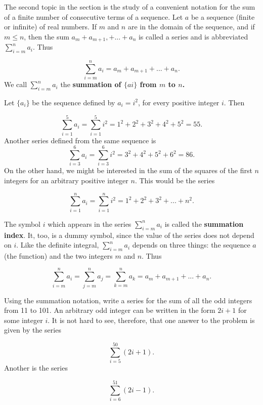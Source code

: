 The second topic in the section is the study of a convenient notation for the sum of a finite number of consecutive terms of a sequence. Let $a$ be a sequence (finite or infinite) of real numbers. If $m$ and $n$ are in the domain of the sequence, and if $m \leq n$, then the sum $a_m + a_{m+1}, + ... + a_n$ is called a series and is abbreviated $\sum_{i = m}^{n} a_{i}$. Thus 

$$
\sum_{i = m}^n a_i = a_m + a_{m+1} + ... + a_n.
$$
\noindent We call $\sum_{i = m}^{n}  a_i$ the \textbf{summation of $\{ ai \}$ from $m$ to $n$.}

\begin{example} Let $\{ a_i \}$ be the sequence defined by $a_i = i^2$, for every positive integer $i$. Then  

$$
 \sum_{i = 1}^{5} a_i =  \sum_{i = 1}^{5} i^2 = 1^2 + 2^2 + 3^2 + 4^2 + 5^2 = 55.
$$
\noindent Another series defined from the same sequence is
$$
 \sum_{i = 3}^{6}a_i = \sum_{i = 3}^{6} i^2 = 3^2 + 4^2 + 5^2 + 6^2 = 86. 
$$
\noindent On the other hand, we might be interested in the sum of the squares of the first $n$ integers for an arbitrary positive integer $n$. This would be the series 

$$
 \sum_{i = 1}^{n} a_i =  \sum_{i = 1}^{n} i^2 = 1^2 + 2^2 + 3^2 + ... + n^2.
$$
\end{example}
\medskip

The symbol $i$ which appears in the series $ \sum_{i = m}^{n} a_i$ is called the \textbf{summation index}. It, too, is a dummy symbol, since the value of the series does not
depend on $i$. Like the definite integral, $ \sum_{i = m}^{n} a_i$ depends on three things: the sequence $a$ (the function) and the two integers $m$ and $n$. Thus

$$
 \sum_{i = m}^{n} a_i =  \sum_{j = m}^{n} a_j =  \sum_{k = m}^{n} a_k = a_m + a_{m+1} + ... + a_n.
$$

\begin{example}
Using the summation notation, write a series for the sum of all the odd integers
from 11 to 101. An arbitrary odd integer can be written in the form $2i + 1$ for some integer $i$. It is not hard to see, therefore, that one answer to the problem is given by the series

$$
 \sum_{i = 5}^{50} (2i + 1).
$$
\noindent Another is the series  

$$
 \sum_{i =6}^{51} (2i - 1).
$$
\end{example}
\medskip

